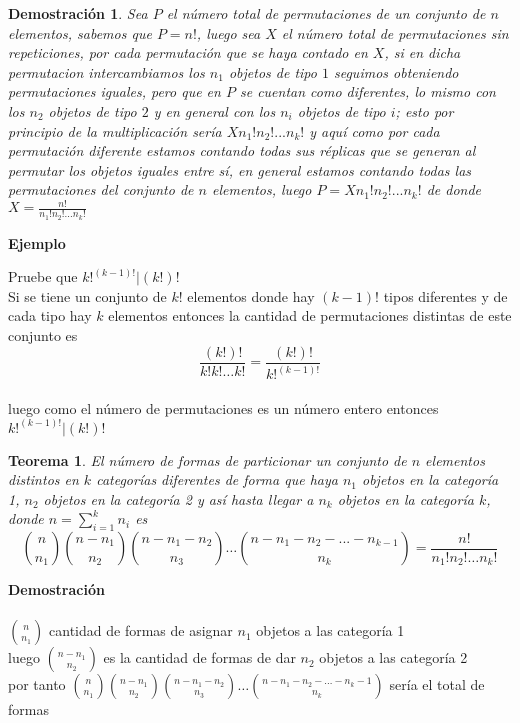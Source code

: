 \documentclass[a4paper,12pt]{report}
\newtheorem*{teo}{Teorema}
\newtheorem*{dem}{Demostración}
\begin{document}
\begin{dem}
    Sea $P$ el n\'umero total de permutaciones de un conjunto de $n$ elementos, sabemos que $P = n!$, luego sea $X$ el n\'umero total de permutaciones sin repeticiones, 
    por cada permutaci\'on que se haya contado en $X$, si en dicha permutacion intercambiamos los $n_1$ objetos de tipo $1$ seguimos obteniendo permutaciones iguales, pero que en $P$ se cuentan como diferentes, lo mismo 
    con los $n_2$ objetos de tipo $2$ y en general con los $n_i$ objetos de tipo $i$; esto por principio de la multiplicaci\'on ser\'ia $Xn_1!n_2!...n_k!$ y aqu\'i como por cada permutaci\'on diferente estamos contando todas sus r\'eplicas que se generan al permutar los objetos iguales entre s\'i, en general estamos contando todas las permutaciones del conjunto de $n$ elementos,
    luego $P = Xn_1!n_2!...n_k!$ de donde $X = \frac{n!}{n_1!n_2!...n_k!}$
\end{dem}


\textbf{Ejemplo}

Pruebe que $k!^{(k-1)!}|(k!)!$\\

Si se tiene un conjunto de $k!$ elementos donde hay $(k-1)!$ tipos diferentes y de cada tipo hay $k$ elementos entonces la cantidad de permutaciones distintas de este conjunto es\\

$$\frac{(k!)!}{k!k!\dots k!}=\frac{(k!)!}{k!^{(k-1)!}}$$ \\

luego como el número de permutaciones es un número entero entonces $k!^{(k-1)!}|(k!)!$


\begin{teo}
 El número de formas de particionar un conjunto de $n$ elementos distintos en $k$ categorías diferentes de forma que haya $n_1$ objetos en la categoría 1, $n_2$ objetos en la categoría 2 y así hasta llegar a $n_k$ objetos en la categoría $k$, donde $n = \sum^k_{i=1}n_i$ es  
 $$\binom{n}{n_1} \binom{n - n_1}{n_2} \binom{n-n_1-n_2}{n_3} \dots \binom{n-n_1-n_2-...-n_{k-1}}{n_k} =\frac{n!}{n_1!n_2!\dots n_k!}$$
\end{teo}



\textbf{Demostración}\\\\
${n}\choose{n_1}$ cantidad de formas de asignar $n_1$ objetos a las categoría 1\\
luego ${n-n_1}\choose{n_2}$ es la cantidad de formas de dar $n_2$ objetos a las categoría 2\\
por tanto ${n}\choose{n_1}$${n-n_1}\choose{n_2}$${n-n_1-n_2}\choose{n_3}$$\dots$${n-n_1-n_2-\dots-n_k-1}\choose{n_k}$ sería el total de formas\\
\end{document}
